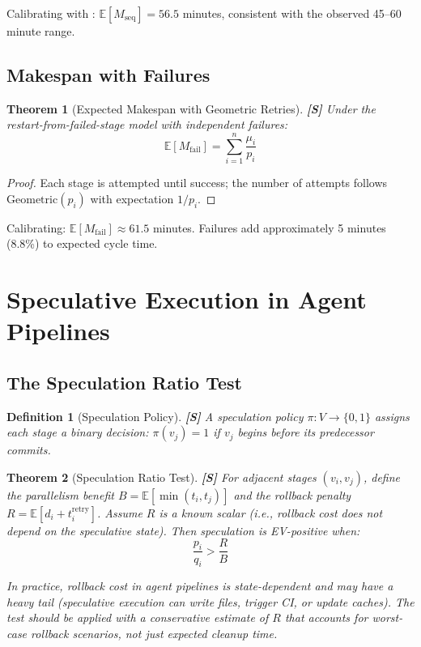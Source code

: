 \documentclass[11pt, a4paper, logo, copyright]{googledeepmind}
\newtheorem{definition}{Definition}[section]
\newtheorem{theorem}{Theorem}[section]
\newcommand{\E}{\mathbb{E}}
\begin{document}
Calibrating with : $\E[M_{\mathrm{seq}}] = 56.5$ minutes, consistent with the observed 45--60 minute range.

\subsection{Makespan with Failures}

\begin{theorem}[Expected Makespan with Geometric Retries]\label{thm:failures}
\textbf{[S]} Under the restart-from-failed-stage model with independent failures:
\[
    \E[M_{\mathrm{fail}}] = \sum_{i=1}^n \frac{\mu_i}{p_i}
\]
\end{theorem}

\begin{proof}
Each stage is attempted until success; the number of attempts follows $\mathrm{Geometric}(p_i)$ with expectation $1/p_i$.
\end{proof}

Calibrating: $\E[M_{\mathrm{fail}}] \approx 61.5$ minutes. Failures add approximately 5 minutes (8.8\%) to expected cycle time.


\section{Speculative Execution in Agent Pipelines}\label{sec:speculation}

\subsection{The Speculation Ratio Test}

\begin{definition}[Speculation Policy]\label{def:spec}
\textbf{[S]} A speculation policy $\pi: V \to \{0,1\}$ assigns each stage a binary decision: $\pi(v_j) = 1$ if $v_j$ begins before its predecessor commits.
\end{definition}

\begin{theorem}[Speculation Ratio Test]\label{thm:spec-ratio}
\textbf{[S]} For adjacent stages $(v_i, v_j)$, define the parallelism benefit $B = \E[\min(t_i, t_j)]$ and the rollback penalty $R = \E[d_i + t_i^{\mathrm{retry}}]$. Assume $R$ is a known scalar (i.e., rollback cost does not depend on the speculative state). Then speculation is EV-positive when:
\[
    \frac{p_i}{q_i} > \frac{R}{B}
\]

In practice, rollback cost in agent pipelines is state-dependent and may have a heavy tail (speculative execution can write files, trigger CI, or update caches). The test should be applied with a conservative estimate of $R$ that accounts for worst-case rollback scenarios, not just expected cleanup time.
\end{theorem}
\end{document}
